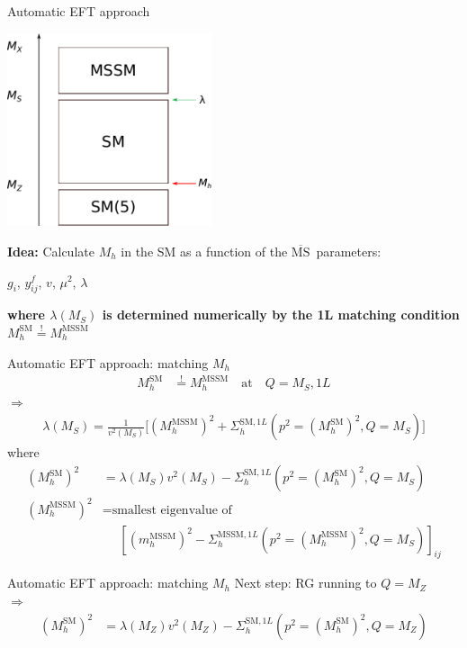 \documentclass[hyperref={pdfpagelabels=false},ngerman]{beamer}
\renewcommand{\emph}{\textbf}
\newcommand{\MSbar}{\ensuremath{\overline{\text{MS}}}}
\newcommand{\SM}{\ensuremath{\text{SM}}}
\newcommand{\MSSM}{\ensuremath{\text{MSSM}}}
\begin{document}
\begin{frame}{Automatic EFT approach}
  \begin{center}
    \includegraphics[width=0.45\textwidth]{images/mssm-sm-tower-eft}\\[1em]
  \end{center}
  \emph{Idea:} Calculate $M_h$ in the SM as a function of the \MSbar\ parameters:\\[1em]
  \begin{center}
    $g_i$, $y^f_{ij}$, $v$, $\mu^2$, $\lambda$
  \end{center}
  \emph{where $\lambda(M_S)$ is determined numerically by the 1L
    matching condition} $M_h^{\SM} \overset{!}{=} M_h^\text{MSSM}$
\end{frame}

\begin{frame}{Automatic EFT approach: matching $M_h$}
  \begin{align*}
    M_h^{\SM} &\overset{!}{=} M_h^\text{MSSM} \quad \text{at} \quad Q = M_S, 1L
  \end{align*}
  $\Rightarrow$
  \begin{align*}
    \lambda(M_S) = \frac{1}{v^2(M_S)} \Big[
    (M_h^\text{MSSM})^2 + \Sigma^{\SM,1L}_h(p^2 = (M_h^\SM)^2,Q = M_S)
    \Big]
  \end{align*}
  where
  \begin{align*}
    (M_h^{\SM})^2 &= \lambda(M_S) v^2(M_S) - \Sigma^{\SM,1L}_h(p^2 = (M_h^{\SM})^2,Q = M_S) \\
    (M_h^\text{MSSM})^2 &= \text{smallest eigenvalue of} \\
    &\phantom{={}} \left[(m_h^\text{MSSM})^2 - \Sigma^{\MSSM,1L}_h(p^2 = (M_h^\text{MSSM})^2,Q = M_S)\right]_{ij}
  \end{align*}
\end{frame}

\begin{frame}{Automatic EFT approach: matching $M_h$}
  Next step: RG running to $Q = M_Z$\\
  $\Rightarrow$
  \begin{align*}
    (M_h^{\SM})^2 &= \lambda(M_Z) v^2(M_Z) - \Sigma^{\SM,1L}_h(p^2 = (M_h^{\SM})^2,Q = M_Z)
  \end{align*}
\end{frame}
\end{document}
